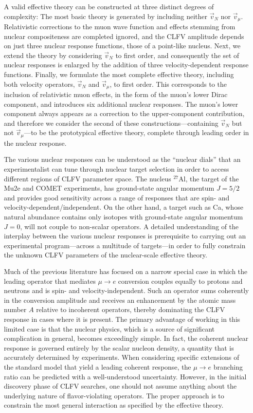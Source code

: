 \documentclass[12pt,letterpaper]{book}
\begin{document}
A valid effective theory can be constructed at three distinct degrees of complexity: The most basic theory is generated by including neither $\vec{v}_N$ nor $\vec{v}_{\mu}$. Relativistic corrections to the muon wave function and effects stemming from nuclear compositeness are completed ignored, and the CLFV amplitude depends on just three nuclear response functions, those of a point-like nucleus. Next, we extend the theory by considering $\vec{v}_N$ to first order, and consequently the set of nuclear responses is enlarged by the addition of three velocity-dependent response functions. Finally, we formulate the most complete effective theory, including both velocity operators, $\vec{v}_N$ and $\vec{v}_{\mu}$, to first order. This corresponds to the inclusion of relativistic muon effects, in the form of the muon's lower Dirac component, and introduces six additional nuclear responses. The muon's lower component always appears as a correction to the upper-component contribution, and therefore we consider the second of these constructions---containing $\vec{v}_N$ but not $\vec{v}_\mu$---to be the prototypical effective theory, complete through leading order in the nuclear response. 

The various nuclear responses can be understood as the ``nuclear dials'' that an experimentalist can tune through nuclear target selection in order to access different regions of CLFV parameter space. The nucleus $^{27}$Al, the target of the Mu2e and COMET experiments, has ground-state angular momentum $J=5/2$ and provides good sensitivity across a range of responses that are spin- and velocity-dependent/independent. On the other hand, a target such as Ca, whose natural abundance contains only isotopes with ground-state angular momentum $J=0$, will not couple to non-scalar operators. A detailed understanding of the interplay between the various nuclear responses is prerequisite to carrying out an experimental program---across a multitude of targets---in order to fully constrain the unknown CLFV parameters of the nuclear-scale effective theory.

Much of the previous literature has focused on a narrow special case in which the leading operator that mediates $\mu\rightarrow e$ conversion couples equally to protons and neutrons and is spin- and velocity-independent. Such an operator sums coherently in the conversion amplitude and receives an enhancement by the atomic mass number $A$ relative to incoherent operators, thereby dominating the CLFV response in cases where it is present. The primary advantage of working in this limited case is that the nuclear physics, which is a source of significant complication in general, becomes exceedingly simple. In fact, the coherent nuclear response is governed entirely by the scalar nucleon density, a quantity that is accurately determined by experiments. When considering specific extensions of the standard model that yield a leading coherent response, the $\mu\rightarrow e$ branching ratio can be predicted with a well-understood uncertainty. However, in the initial discovery phase of CLFV searches, one should not assume anything about the underlying nature of flavor-violating operators. The proper approach is to constrain the most general interaction as specified by the effective theory.
\end{document}
